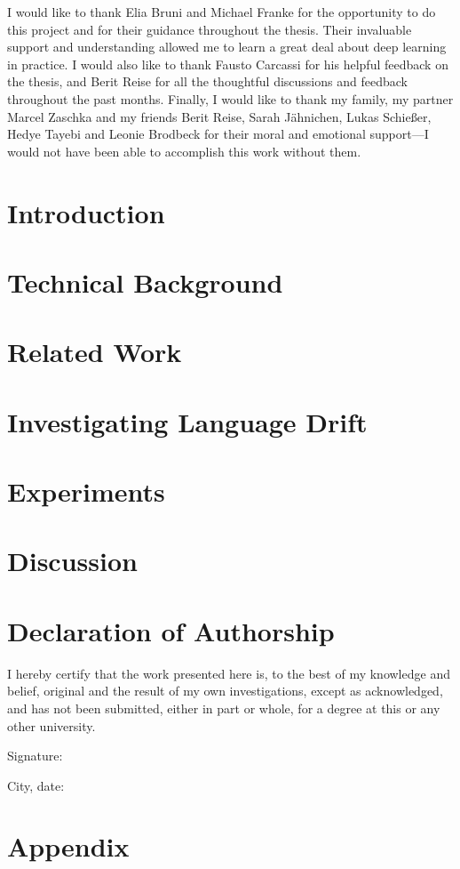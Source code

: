 \documentclass[11pt, twoside, openright]{report} %
\begin{document}
I would like to thank Elia Bruni and Michael Franke for the opportunity to do this project and for their guidance throughout the thesis. Their invaluable support and understanding allowed me to learn a great deal about deep learning in practice. I would also like to thank Fausto Carcassi for his helpful feedback on the thesis, and Berit Reise for all the thoughtful discussions and feedback throughout the past months.
Finally, I would like to thank my family, my partner Marcel Zaschka and my friends Berit Reise, Sarah J\"ahnichen, Lukas Schießer, Hedye Tayebi and Leonie Brodbeck for their moral and emotional support---I would not have been able to accomplish this work without them.

\tableofcontents

\chapter{Introduction}
\label{chapter01}


 \chapter{Technical Background}
 \label{chapter02}
 
 
\chapter{Related Work}
\label{chapter03}


\chapter{Investigating Language Drift}
\label{chapter04}


\chapter{Experiments}
\label{chapter05}


\chapter{Discussion}
\label{chapter06}


\chapter*{Declaration of Authorship}
I hereby certify that the work presented here is, to the best of my knowledge and belief, original and the result of my own investigations, except as acknowledged, and has not been submitted, either in part or whole, for a degree at this or any other university.

\vspace{2cm}
Signature:~\makebox[3in]{\hrulefill}

\vspace{1cm}
City, date:~\makebox[3in]{\hrulefill} 

\appendix
\chapter{Appendix}	
\label{appendix}


\printbibliography
%
\end{document}
